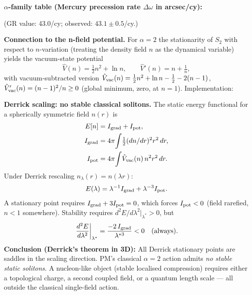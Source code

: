\documentclass[10pt,twocolumn]{article}
\begin{document}
\textbf{$\alpha$-family table (Mercury precession rate $\Delta\omega$ in arcsec/cy):}
\begin{center}
\end{center}
(GR value: 43.0\arcsec/cy; observed: $43.1\pm 0.5$\arcsec/cy.)

\textbf{Connection to the n-field potential.}
For $\alpha=2$ the stationarity of $S_2$ with respect to $n$-variation
(treating the density field $n$ as the dynamical variable) yields the
vacuum-state potential
\[
  \hat V(n) = \tfrac{1}{2}n^2 + \ln n,
  \qquad
  \hat V'(n) = n + \tfrac{1}{n},
\]
with vacuum-subtracted version
$\hat V_{\rm vac}(n) = \tfrac{1}{2}n^2+\ln n-\tfrac{1}{2}-2(n-1)$,
$\hat V'_{\rm vac}(n) = (n-1)^2/n \geq 0$ (global minimum, zero, at $n=1$).
Implementation: 

\textbf{Derrick scaling: no stable classical solitons.}
The static energy functional for a spherically symmetric field $n(r)$ is
\begin{align*}
  E[n] &= I_{\rm grad} + I_{\rm pot}, \\
  I_{\rm grad} &= 4\pi\!\int\!\tfrac{1}{2}(dn/dr)^2 r^2\,dr, \\
  I_{\rm pot}  &= 4\pi\!\int\!\hat V_{\rm vac}(n)\,n^2 r^2\,dr.
\end{align*}
Under Derrick rescaling $n_\lambda(r)=n(\lambda r)$:
\[
  E(\lambda) = \lambda^{-1}I_{\rm grad} + \lambda^{-3}I_{\rm pot}.
\]
A stationary point requires $I_{\rm grad}+3I_{\rm pot}=0$, which forces
$I_{\rm pot}<0$ (field rarefied, $n<1$ somewhere).  Stability requires
$d^2E/d\lambda^2|_{\lambda^*}>0$, but
\[
  \left.\frac{d^2E}{d\lambda^2}\right|_{\lambda^*}
  = \frac{-2\,I_{\rm grad}}{\lambda^{*3}} < 0 \quad (\text{always}).
\]
\textbf{Conclusion (Derrick's theorem in 3D):}
All Derrick stationary points are saddles in the scaling direction.
PM's classical $\alpha=2$ action admits \emph{no stable static solitons}.
A nucleon-like object (stable localised compression) requires either
a topological charge, a second coupled field, or a quantum length scale
--- all outside the classical single-field action.
\end{document}
